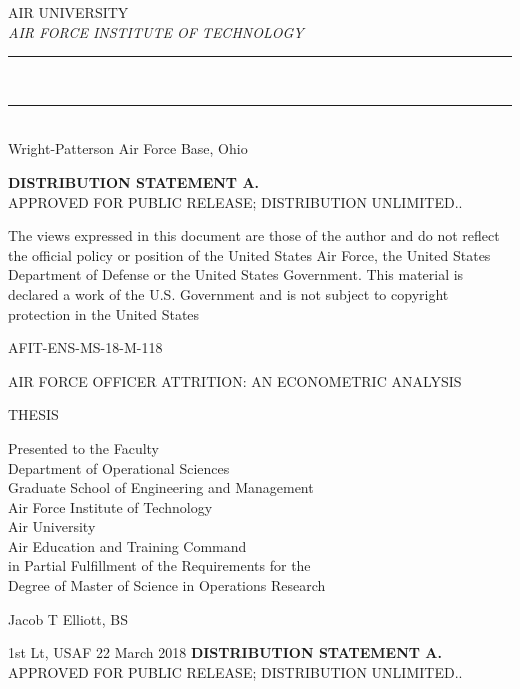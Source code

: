 \documentclass[12pt,letterpaper,toc=flat,oneside]{report}
\theoremstyle{definition}
\theoremstyle{definition}
\theoremstyle{definition}
\theoremstyle{remark}
\begin{document}
\begin{titlepage}
\begin{center}
\begin{bfseries}
 		\textsf{\large{}AIR UNIVERSITY}\\[20pt]
 		\textsl{\Large AIR FORCE INSTITUTE OF TECHNOLOGY}\\[-8pt]
 		\rule{5.8in}{1mm}\\[-12pt]
 		\rule{5.8in}{0.3mm}\\[8pt]
 		\textsf{Wright-Patterson Air Force Base, Ohio}\\[15pt]
 	    \end{bfseries}
 	    \vspace{10pt}
 	    \MakeUppercase{\textbf{distribution statement A.}}\\[-1pt]
 	    \MakeUppercase{Approved for public release; distribution unlimited..}
 	\end{center}%
 	\vfill
 	\newpage 
 	\pagestyle{plain}
    \end{titlepage}
	\thispagestyle{empty}
	\singlespacing
	\null	
	\vfill 
	\noindent The views expressed in this document are those of the
author and do not reflect the official policy or position of the
United States Air Force, the United States Department of Defense or
the United States Government.  This material is declared a work of the
U.S. Government and is not subject to copyright protection in the
United States
	\vfill 
	\doublespacing
	\newpage
	\pagestyle{plain}
    \begin{titlepage}
	\thispagestyle{empty}
	\noindent AFIT-ENS-MS-18-M-118  
	\vfill
	\begin{center}
	    \MakeUppercase{Air Force Officer Attrition: An Econometric Analysis}\par
	    \vskip 1cm
	    \MakeUppercase{Thesis}\par
	    \vskip 1cm
	    Presented to the Faculty\\
	    Department of Operational Sciences\\
	    Graduate School of Engineering and Management~\\
	    Air Force Institute of Technology~\\
	    Air University~\\
	    Air Education and Training Command~\\
	    in Partial Fulfillment of the Requirements for the~\\
	    Degree of Master of Science in Operations Research\\
	    \vskip 1cm
	    {Jacob T Elliott, BS\par}
	    {1st Lt, \MakeUppercase{USAF}}
	    \vskip 1cm
	    22 March 2018
	    \vskip 1cm
	    \MakeUppercase{\textbf{distribution statement A.}}\\[-8pt]
	    \MakeUppercase{Approved for public release; distribution unlimited..}
	    \vfill
	\end{center}
	\newpage 
	\pagestyle{plain}
    \end{titlepage}
\end{document}

